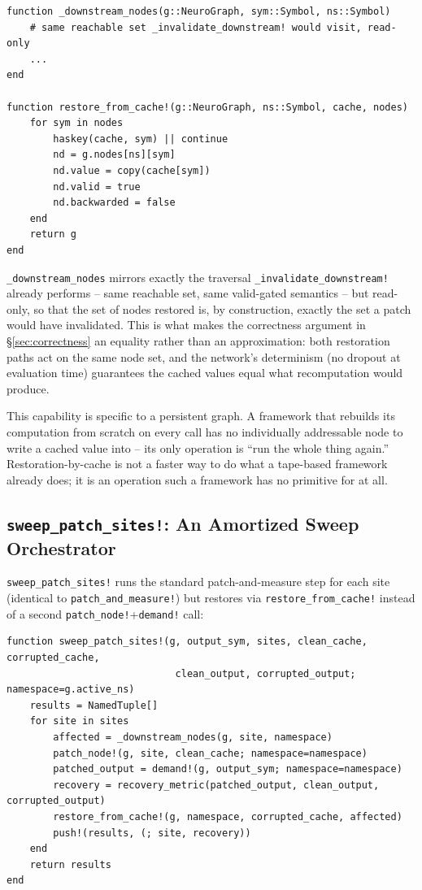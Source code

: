 \documentclass{article}
\begin{document}
\begin{lstlisting}[caption={\texttt{restore\_from\_cache!} and its cone (\texttt{src/patching.jl})},label={lst:restorecache}]
function _downstream_nodes(g::NeuroGraph, sym::Symbol, ns::Symbol)
    # same reachable set _invalidate_downstream! would visit, read-only
    ...
end

function restore_from_cache!(g::NeuroGraph, ns::Symbol, cache, nodes)
    for sym in nodes
        haskey(cache, sym) || continue
        nd = g.nodes[ns][sym]
        nd.value = copy(cache[sym])
        nd.valid = true
        nd.backwarded = false
    end
    return g
end
\end{lstlisting}

\texttt{\_downstream\_nodes} mirrors exactly the traversal \texttt{\_invalidate\_downstream!}
already performs -- same reachable set, same valid-gated semantics -- but read-only, so that the
set of nodes restored is, by construction, exactly the set a patch would have invalidated. This
is what makes the correctness argument in \S\ref{sec:correctness} an equality rather than an
approximation: both restoration paths act on the same node set, and the network's determinism
(no dropout at evaluation time) guarantees the cached values equal what recomputation would
produce.

This capability is specific to a persistent graph. A framework that rebuilds its computation from
scratch on every call has no individually addressable node to write a cached value into -- its
only operation is ``run the whole thing again.'' Restoration-by-cache is not a faster way to do
what a tape-based framework already does; it is an operation such a framework has no primitive
for at all.

\subsection{\texttt{sweep\_patch\_sites!}: An Amortized Sweep Orchestrator}

\texttt{sweep\_patch\_sites!} runs the standard patch-and-measure step for each site (identical to
\texttt{patch\_and\_measure!}) but restores via \texttt{restore\_from\_cache!} instead of a second
\texttt{patch\_node!}+\texttt{demand!} call:

\begin{lstlisting}[caption={\texttt{sweep\_patch\_sites!} (\texttt{src/patching.jl})},label={lst:sweep}]
function sweep_patch_sites!(g, output_sym, sites, clean_cache, corrupted_cache,
                             clean_output, corrupted_output; namespace=g.active_ns)
    results = NamedTuple[]
    for site in sites
        affected = _downstream_nodes(g, site, namespace)
        patch_node!(g, site, clean_cache; namespace=namespace)
        patched_output = demand!(g, output_sym; namespace=namespace)
        recovery = recovery_metric(patched_output, clean_output, corrupted_output)
        restore_from_cache!(g, namespace, corrupted_cache, affected)
        push!(results, (; site, recovery))
    end
    return results
end
\end{lstlisting}
\end{document}
